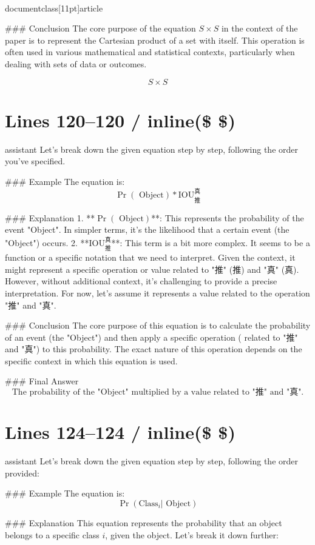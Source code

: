 \\documentclass[11pt]{article}
\begin{document}
### Conclusion
The core purpose of the equation \( S \times S \) in the context of the paper is to represent the Cartesian product of a set with itself. This operation is often used in various mathematical and statistical contexts, particularly when dealing with sets of data or outcomes.

\[
\boxed{S \times S}
\]


\section*{Lines 120–120 / inline(\$ \$) }
assistant
Let's break down the given equation step by step, following the order you've specified.

### Example
The equation is:
\[
\Pr(\textrm{ Object}) * \textrm{IOU}_{\textrm{推}}^{\textrm{真}}
\]

### Explanation
1. **\(\Pr(\textrm{ Object})\)**: This represents the probability of the event "Object". In simpler terms, it's the likelihood that a certain event (the "Object") occurs.
2. **\(\textrm{IOU}_{\textrm{推}}^{\textrm{真}}\)**: This term is a bit more complex. It seems to be a function or a specific notation that we need to interpret. Given the context, it might represent a specific operation or value related to "推" (推) and "真" (真). However, without additional context, it's challenging to provide a precise interpretation. For now, let's assume it represents a value related to the operation "推" and "真".

### Conclusion
The core purpose of this equation is to calculate the probability of an event (the "Object") and then apply a specific operation ( related to "推" and "真") to this probability. The exact nature of this operation depends on the specific context in which this equation is used.

### Final Answer
\[
\boxed{\text{The probability of the "Object" multiplied by a value related to "推" and "真".}}
\]


\section*{Lines 124–124 / inline(\$ \$) }
assistant
Let's break down the given equation step by step, following the order provided:

### Example
The equation is:
\[
\Pr(\textrm{Class}_i | \textrm{ Object})
\]

### Explanation
This equation represents the probability that an object belongs to a specific class \(i\), given the object. Let's break it down further:
\end{document}
